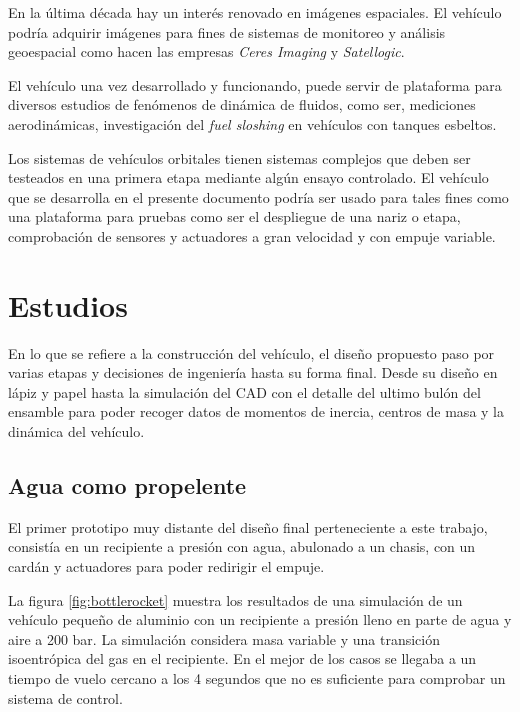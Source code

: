 \medskip

En la última década hay un interés renovado en imágenes espaciales. El vehículo podría adquirir imágenes para fines de sistemas de monitoreo y análisis geoespacial como hacen las empresas \textit{Ceres Imaging} y \textit{Satellogic}. %

\medskip

El vehículo una vez desarrollado y funcionando, puede servir de plataforma para diversos
estudios de fenómenos de dinámica de fluidos, como ser, mediciones aerodinámicas,
investigación del \textit{fuel sloshing} en vehículos con tanques esbeltos.

\medskip


Los sistemas de vehículos orbitales tienen sistemas complejos que deben ser testeados en una primera etapa mediante algún ensayo controlado. El vehículo que se desarrolla en el presente documento podría ser usado para tales fines como una plataforma para pruebas como ser el despliegue de una nariz o etapa, comprobación de sensores y actuadores a gran velocidad y con empuje variable.


\section{Estudios}
En lo que se refiere a la construcción del vehículo, el diseño propuesto paso por varias etapas y
decisiones de ingeniería hasta su forma final. Desde su diseño en lápiz y papel hasta la
simulación del CAD con el detalle del ultimo bulón del ensamble para poder recoger datos de
momentos de inercia, centros de masa y la dinámica del vehículo.

\subsection{Agua como propelente}\label{ssec:propAgua}
El primer prototipo muy distante del diseño final perteneciente a este trabajo, consistía en un
recipiente a presión con agua, abulonado a un chasis, con un cardán y actuadores para poder redirigir el
empuje. 

\medskip

La figura \ref{fig:bottlerocket} muestra los resultados de una simulación de un vehículo pequeño de aluminio con un recipiente a presión lleno en parte de agua y aire a 200 bar. La simulación considera masa variable y una transición isoentrópica del gas en el recipiente. En el mejor de los casos se llegaba a un tiempo de vuelo cercano a los 4 segundos que no es suficiente para comprobar un sistema de control. 

